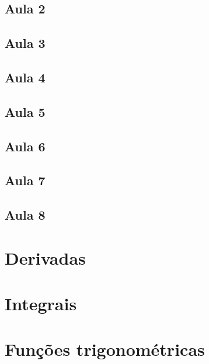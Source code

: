 \documentclass[12pt, a4paper]{article}
\begin{document}
			\subsection{Aula 2}
				
			\subsection{Aula 3}
				
			\subsection{Aula 4}
				
			\subsection{Aula 5}
				
			\subsection{Aula 6}
				
			\subsection{Aula 7}
				
			\subsection{Aula 8}		
				
		\appendix
		\section{Derivadas}
			
		\section{Integrais}
			
		\section{Funções trigonométricas}
			
				
		
				
\end{document}

